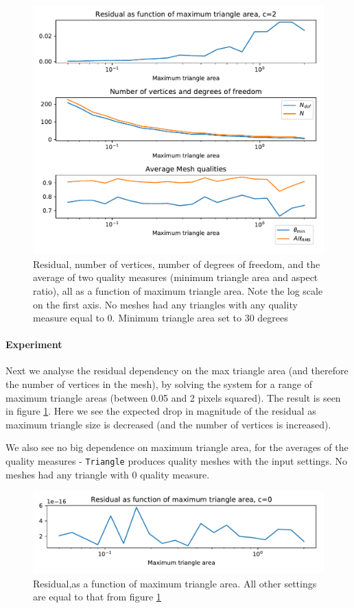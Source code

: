 \documentclass[sigconf]{acmart}
\begin{document}
\begin{figure}
	\includegraphics[width=\linewidth]{experiment1c2.pdf}
	\caption{Residual, number of vertices, number of degrees of freedom, and the average of two quality measures (minimum triangle area and aspect ratio), all as a function of maximum triangle area. Note the log scale on the first axis. No meshes had any triangles with any quality measure equal to 0. Minimum triangle area set to 30 degrees}
	\label{fig:exp2D1}
\end{figure}

\paragraph{Experiment}
Next we analyse the residual dependency on the max triangle area (and therefore the number of vertices in the mesh), by solving the system for a range of maximum triangle areas (between 0.05 and 2 pixels squared). The result is seen in figure \ref{fig:exp2D1}. Here we see the expected drop in magnitude of the residual as maximum triangle size is decreased (and the number of vertices is increased).

We also see no big dependence on maximum triangle area, for the averages of the quality measures - \texttt{Triangle} produces quality meshes with the input settings. No meshes had any triangle with 0 quality measure.
\begin{figure}
	\includegraphics[width=\linewidth]{experiment2c0.pdf}
	\caption{Residual,as a function of maximum triangle area. All other settings are equal to that from figure \ref{fig:exp2D1}}
	\label{fig:exp2D2}
\end{figure}
\end{document}

